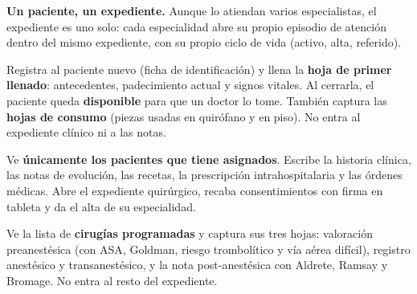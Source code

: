 \documentclass[11pt,letterpaper]{article}
\newcommand{\seccion}[1]{%
    \vspace{4pt}
    \noindent{\large\bfseries\color{tinta}#1}\par\vspace{2pt}
    \noindent{\color{azulmit}\rule{\linewidth}{1.2pt}}\par
    \vspace{6pt}
}
\begin{document}
\begin{center}
\end{center}

\vspace{4pt}
\begin{cajaNota}
\textbf{Un paciente, un expediente.} Aunque lo atiendan varios especialistas, el expediente es uno solo: cada especialidad abre su propio episodio de atención dentro del mismo expediente, con su propio ciclo de vida (activo, alta, referido).
\end{cajaNota}

\newpage
\seccion{2. Quién hace qué}

\begin{cajaRol}[Enfermería]
Registra al paciente nuevo (ficha de identificación) y llena la \textbf{hoja de primer llenado}: antecedentes, padecimiento actual y signos vitales. Al cerrarla, el paciente queda \textbf{disponible} para que un doctor lo tome. También captura las \textbf{hojas de consumo} (piezas usadas en quirófano y en piso). No entra al expediente clínico ni a las notas.
\end{cajaRol}

\vspace{6pt}
\begin{cajaRol}
Ve \textbf{únicamente los pacientes que tiene asignados}. Escribe la historia clínica, las notas de evolución, las recetas, la prescripción intrahospitalaria y las órdenes médicas. Abre el expediente quirúrgico, recaba consentimientos con firma en tableta y da el alta de su especialidad.
\end{cajaRol}

\vspace{6pt}
\begin{cajaRol}[Anestesiólogo]
Ve la lista de \textbf{cirugías programadas} y captura sus tres hojas: valoración preanestésica (con ASA, Goldman, riesgo trombolítico y vía aérea difícil), registro anestésico y transanestésico, y la nota post-anestésica con Aldrete, Ramsay y Bromage. No entra al resto del expediente.
\end{cajaRol}
\end{document}
